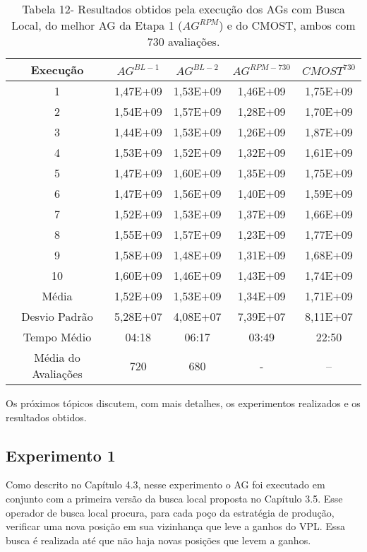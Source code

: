 \begin{table}[H]
\centering
\caption{Tabela 12- Resultados obtidos pela execução dos AGs com Busca Local, do melhor AG da Etapa 1 ($AG^{RPM}$) e do CMOST, ambos com 730 avaliações.}
\label{tab:results2_1}
\begin{tabular}{|c|c|c|c|c|}
\hline
Execução & $AG^{BL-1}$ & $AG^{BL-2}$ & $AG^{RPM-730}$ & $CMOST^730$ \\ \hline
1 & 1,47E+09 & 1,53E+09 & 1,46E+09 & 1,75E+09 \\ \hline
2 & 1,54E+09 & 1,57E+09 & 1,28E+09 & 1,70E+09 \\ \hline
3 & 1,44E+09 & 1,53E+09	& 1,26E+09 & 1,87E+09 \\ \hline
4 & 1,53E+09 & 1,52E+09 & 1,32E+09 & 1,61E+09 \\ \hline
5 & 1,47E+09 & 1,60E+09 & 1,35E+09 & 1,75E+09 \\ \hline
6 & 1,47E+09 & 1,56E+09 & 1,40E+09 & 1,59E+09 \\ \hline
7 & 1,52E+09 & 1,53E+09 & 1,37E+09 & 1,66E+09 \\ \hline
8 & 1,55E+09 & 1,57E+09 & 1,23E+09 & 1,77E+09 \\ \hline
9 & 1,58E+09 & 1,48E+09 & 1,31E+09 & 1,68E+09 \\ \hline
10 & 1,60E+09 & 1,46E+09 & 1,43E+09 & 1,74E+09\\ \hline
Média & 1,52E+09 & 1,53E+09 & 1,34E+09 & 1,71E+09\\ \hline
Desvio Padrão & 5,28E+07 & 4,08E+07 & 7,39E+07 & 8,11E+07\\ \hline
Tempo Médio & 04:18 & 06:17 & 03:49 & 22:50\\ \hline
Média do Avaliações & 720 & 680	 & - & --\\ \hline

\end{tabular}
\end{table}

Os próximos tópicos discutem, com mais detalhes, os experimentos realizados e os resultados obtidos. 


\subsection{Experimento 1}

Como descrito no Capítulo 4.3, nesse experimento o AG foi executado em conjunto com a primeira versão da busca local proposta no Capítulo 3.5. Esse operador de busca local procura, para cada poço da estratégia de produção, verificar uma nova posição em sua vizinhança que leve a ganhos do VPL. Essa busca é realizada até que não haja novas posições que levem a ganhos.

